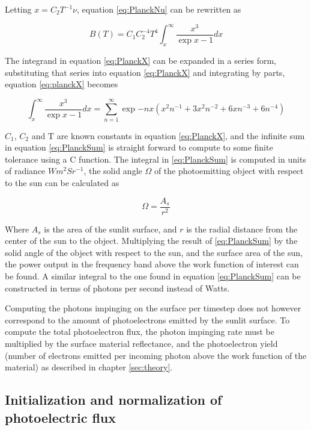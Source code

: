 Letting $x = C_2 T^{-1} \nu$, equation \ref{eq:PlanckNu} can be rewritten as 

\begin{equation}\label{eq:PlanckX}
    B(T) = C_1 C_2^{-4} T^4 \int^{\infty}_x \frac{x^3}{\exp{x} - 1} dx
\end{equation}

The integrand in equation \ref{eq:PlanckX} can be expanded in a series form, substituting that series into equation \ref{eq:PlanckX} and integrating by parts, equation \ref{eq:planckX} becomes

\begin{equation}\label{eq:PlanckSum}
    \int^{\infty}_x \frac{x^3}{\exp{x} - 1} dx = \sum^{\infty}_{n=1} \exp{-n x} \left(x^2 n^{-1} + 3 x^2 n^{-2} + 6 x n^{-3} + 6 n^{-4} \right)
\end{equation}

$C_1$, $C_2$ and T are known constants in equation \ref{eq:PlanckX}, and the infinite sum in equation \ref{eq:PlanckSum} is straight forward to compute to some finite tolerance using a C function. The integral in \ref{eq:PlanckSum} is computed in units of radiance $W m^2 Sr^{-1}$, the solid angle $\Omega$ of the photoemitting object with respect to the sun can be calculated as

\begin{equation*}
    \Omega = \frac{A_s}{r^2}
\end{equation*}

Where $A_s$ is the area of the sunlit surface, and $r$ is the radial distance from the center of the sun to the object. Multiplying the result of \ref{eq:PlanckSum} by the solid angle of the object with respect to the sun, and the surface area of the sun, the power output in the frequency band above the work function of interest can be found. A similar integral to the one found in equation \ref{eq:PlanckSum} can be constructed in terms of photons per second instead of Watts.

Computing the photons impinging on the surface per timestep does not however correspond to the amount of photoelectrons emitted by the sunlit surface. To compute the total photoelectron flux, the photon impinging rate must be multiplied by the surface material reflectance, and the photoelectron yield (number of electrons emitted per incoming photon above the work function of the material) as described in chapter \ref{sec:theory}.


\subsection{Initialization and normalization of photoelectric flux}

